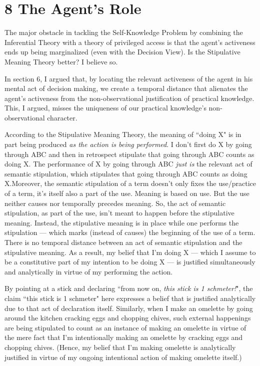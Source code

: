 \documentclass[a4paper,12pt]{article}
\begin{document}
\section*{8 The Agent's Role}

The major obstacle in tackling the Self-Knowledge Problem by combining the Inferential Theory with a theory of privileged access is that the agent's activeness ends up being marginalized (even with the Decision View). Is the Stipulative Meaning Theory better? I believe so.
 
In section 6, I argued that, by locating the relevant activeness of the agent in his mental act of decision making, we create a temporal distance that alienates the agent's activeness from the non-observational justification of practical knowledge. This, I argued, misses the uniqueness of our practical knowledge's non-observational character.

According to the Stipulative Meaning Theory, the meaning of ``doing X" is in part being produced \emph{as the action is being performed}. I don't first do X by going through ABC and then in retrospect stipulate that going through ABC counts as doing X. The performance of X by going through ABC \emph{just is} the relevant act of semantic stipulation, which stipulates that going through ABC counts as doing X.\footnotemark Moreover, the semantic stipulation of a term doesn't only fixes the use/practice of a term, it's itself also a part of the use. Meaning is based on use. But the use neither causes nor temporally precedes meaning. So, the act of semantic stipulation, as part of the use, isn't meant to happen before the stipulative meaning. Instead, the stipulative meaning is in place while one performs the stipulation --- which marks (instead of causes) the beginning of the use of a term. There is no temporal distance between an act of semantic stipulation and the stipulative meaning. As a result, my belief that I'm doing X --- which I assume to be a constitutive part of my intention to be doing X --- is justified simultaneously and analytically in virtue of my performing the action.


By pointing at a stick and declaring ``from now on, \emph{this stick is 1 schmeter!}", the claim ``this stick is 1 schmeter" here expresses a belief that is justified analytically due to that act of declaration itself. Similarly, when I make an omelette by going around the kitchen cracking eggs and chopping chives, such external happenings are being stipulated to count as an instance of making an omelette in virtue of the mere fact that I'm intentionally making an omelette by cracking eggs and chopping chives. (Hence, my belief that I'm making omelette is analytically justified in virtue of my ongoing intentional action of making omelette itself.)
\end{document}
